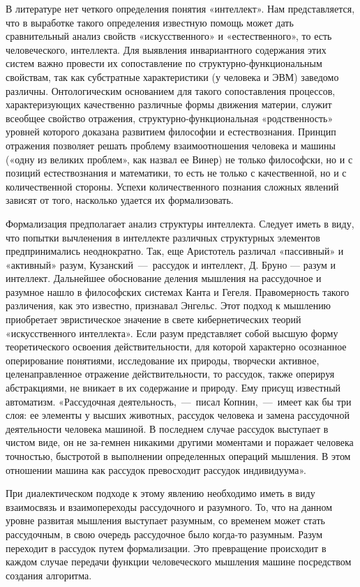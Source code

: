\documentclass[14pt]{extarticle}
\begin{document}
В литературе нет четкого определения понятия «интеллект». Нам представляется, что в выработке такого определения известную помощь может дать сравнительный анализ свойств «искусственного» и «естественного», то есть человеческого, интеллекта. Для выявления инвариантного содержания этих систем важно провести их сопоставление по структурно-функциональным свойствам, так как субстратные характеристики (у человека и ЭВМ) заведомо различны. Онтологическим основанием для такого сопоставления процессов, характеризующих качественно различные формы движения материи, служит всеобщее свойство отражения, структурно-функциональная «родственность» уровней которого доказана развитием философии и естествознания. Принцип отражения позволяет решать проблему взаимоотношения человека и машины («одну из великих проблем», как назвал ее Винер) не только философски, но и с позиций естествознания и математики, то есть не только с качественной, но и с количественной стороны. Успехи количественного познания сложных явлений зависят от того, насколько удается их формализовать.

Формализация предполагает анализ структуры интеллекта. Следует иметь в виду, что попытки вычленения в интеллекте различных структурных элементов предпринимались неоднократно. Так, еще Аристотель различал «пассивный» и «активный» разум, Кузанский~---~рассудок и интеллект, Д. Бруно — разум и интеллект. Дальнейшее обоснование деления мышления на рассудочное и разумное нашло в философских системах Канта и Гегеля. Правомерность такого различения, как это известно, признавал Энгельс. Этот подход к мышлению приобретает эвристическое значение в свете кибернетических теорий «искусственного интеллекта». Если разум представляет собой высшую форму теоретического освоения действительности, для которой характерно осознанное оперирование понятиями, исследование их природы, творчески активное, целенаправленное отражение действительности, то рассудок, также оперируя абстракциями, не вникает в их содержание и природу. Ему присущ известный автоматизм. «Рассудочная деятельность,~---~писал Копнин,~---~имеет как бы три слоя: ее элементы у высших животных, рассудок человека и замена рассудочной деятельности человека машиной. В последнем случае рассудок выступает в чистом виде, он не за-гемнен никакими другими моментами и поражает человека точностью, быстротой в выполнении определенных операций мышления. В этом отношении машина как рассудок превосходит рассудок индивидуума».

При диалектическом подходе к этому явлению необходимо иметь в виду взаимосвязь и взаимопереходы рассудочного и разумного. То, что на данном уровне развитая мышления выступает разумным, со временем может стать рассудочным, в свою очередь рассудочное было когда-то разумным. Разум переходит в рассудок путем формализации. Это превращение происходит в каждом случае передачи функции человеческого мышления машине посредством создания алгоритма.
\end{document}
